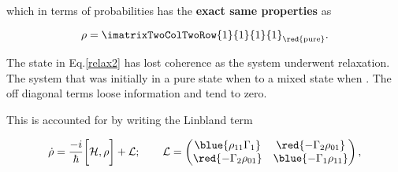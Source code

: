  \noindent which in  terms of probabilities has  the \textbf{exact same
   properties} as

 \begin{equation}\label{relax3}
   \rho = \imatrixTwoColTwoRow{1}{1}{1}{1}_{\red{\text{pure}}}.
 \end{equation}

 \noindent The  state in  Eq.\eqref{relax2} has  lost coherence  as the
 system underwent relaxation.  The system  that was initially in a pure
 state {when } to a
 mixed                            state                            when
 .   The   off
 diagonal terms loose information and tend to zero.

 This is accounted for by writing the Linbland term

 \begin{equation}
   \dot{\rho} = \frac{-i}{\hbar}\bigg[\mathcal{H},\rho\bigg] + \mathcal{L};\quad\quad\mathcal{L} = \begin{pmatrix}
     \blue{\rho_{11}\Gamma_1 }& \red{-\Gamma_2\rho_{01}}\\\red{-\Gamma_2\rho_{01}}&\blue{-\Gamma_1\rho_{11}}
   \end{pmatrix},
 \end{equation}

